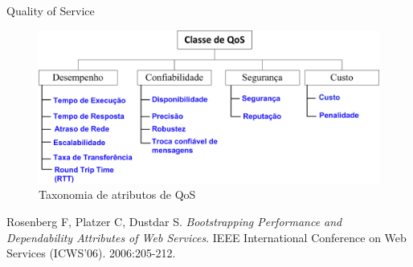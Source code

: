 \documentclass[xcolor=svgnames]{beamer}
\begin{document}


    \begin{frame}{Quality of Service}
      \begin{figure}[!h]
          \centering
          \includegraphics[width=1.0\textwidth]{QoSTaxonomy.png}
          \caption{Taxonomia de atributos de QoS \cite{Rosenberg2006}}
      \end{figure}	
      
      \tiny{
        \begin{thebibliography}{2}
           \beamertemplatearticlebibitems
            Rosenberg F, Platzer C, Dustdar S. {\em Bootstrapping Performance and Dependability Attributes of Web Services}.
            IEEE International Conference on Web Services (ICWS’06). 2006:205-212.
       \end{thebibliography}
      }
    \end{frame}
\end{document}
